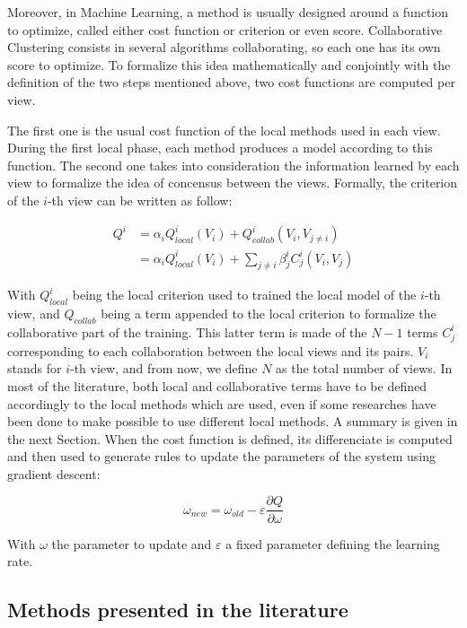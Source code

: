     Moreover, in Machine Learning, a method is usually designed around a function to optimize, called either cost function or criterion or even score. Collaborative Clustering consists in several algorithms collaborating, so each one has its own score to optimize. To formalize this idea mathematically and conjointly with the definition of the two steps mentioned above, two cost functions are computed per view.

    The first one is the usual cost function of the local methods used in each view. During the first local phase, each method produces a model according to this function. The second one takes into consideration the information learned by each view to formalize the idea of concensus between the views. Formally, the criterion of the $i$-th view can be written as follow:

    \begin{align}
        \label{eq:globalC}
        Q^i &= \alpha_i Q^i_{local}(V_i) + Q^i_{collab}(V_i, V_{j\neq i})\\
        &= \alpha_i Q^i_{local}(V_i) + \sum_{j\neq i} \beta^i_j C_j^i(V_i, V_j)
    \end{align}

    With $Q^i_{local}$ being the local criterion used to trained the local model of the $i$-th view, and $Q_{collab}$ being a term appended to the local criterion to formalize the collaborative part of the training. This latter term is made of the $N-1$ terms $C_j^i$ corresponding to each collaboration between the local views and its pairs. $V_i$ stands for $i$-th view, and from now, we define $N$ as the total number of views. In most of the literature, both local and collaborative terms have to be defined accordingly to the local methods which are used, even if some researches have been done to make possible to use different local methods. A summary is given in the next Section. When the cost function is defined, its differenciate is computed and then used to generate rules to update the parameters of the system using gradient descent: 
    
    \begin{equation}
        \omega_{new} = \omega_{old} - \varepsilon \frac{\partial Q}{\partial \omega}
        \label{eq:gradient_descent}
    \end{equation}
    
    With $\omega$ the parameter to update and $\varepsilon$ a fixed parameter defining the learning rate. 
    
    \subsection{Methods presented in the literature}

